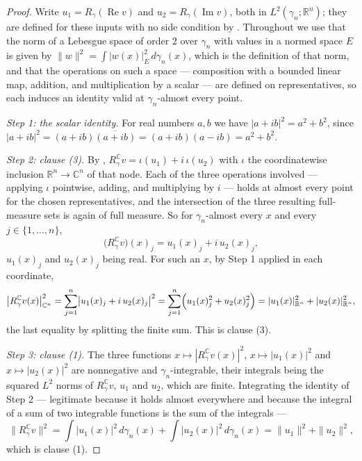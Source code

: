 \begin{proof}
Write $u_1 = R_\gamma(\operatorname{Re} v)$ and $u_2 = R_\gamma(\operatorname{Im} v)$,
both in $L^2(\gamma_n;\mathbb{R}^n)$; they are defined for these inputs with no
side condition by .  Throughout we use that the norm of a
Lebesgue space of order $2$ over $\gamma_n$ with values in a normed space $E$ is
given by $\|w\|^2 = \int |w(x)|_E^2 \, d\gamma_n(x)$, which is the definition of
that norm, and that the operations on such a space --- composition with a bounded
linear map, addition, and multiplication by a scalar --- are defined on
representatives, so each induces an identity valid at $\gamma_n$-almost every
point.

\emph{Step 1: the scalar identity.}
For real numbers $a, b$ we have $|a + ib|^2 = a^2 + b^2$, since
$|a+ib|^2 = (a+ib)\overline{(a+ib)} = (a+ib)(a-ib) = a^2 + b^2$.

\emph{Step 2: clause (3).}
By ,
$R_\gamma^{\mathbb{C}} v = \iota(u_1) + i\,\iota(u_2)$ with $\iota$ the
coordinatewise inclusion $\mathbb{R}^n \to \mathbb{C}^n$ of that node.  Each of
the three operations involved --- applying $\iota$ pointwise, adding, and
multiplying by $i$ --- holds at almost every point for the chosen
representatives, and the intersection of the three resulting full-measure sets
is again of full measure.  So for $\gamma_n$-almost every $x$ and every
$j \in \{1,\ldots,n\}$,
\[
  \bigl(R_\gamma^{\mathbb{C}} v\bigr)(x)_j
    = u_1(x)_j + i\,u_2(x)_j ,
\]
$u_1(x)_j$ and $u_2(x)_j$ being real.  For such an $x$, by Step 1 applied in
each coordinate,
\[
  \bigl|R_\gamma^{\mathbb{C}} v(x)\bigr|_{\mathbb{C}^n}^2
    = \sum_{j=1}^n \bigl|u_1(x)_j + i\,u_2(x)_j\bigr|^2
    = \sum_{j=1}^n \Bigl(u_1(x)_j^2 + u_2(x)_j^2\Bigr)
    = |u_1(x)|_{\mathbb{R}^n}^2 + |u_2(x)|_{\mathbb{R}^n}^2 ,
\]
the last equality by splitting the finite sum.  This is clause (3).

\emph{Step 3: clause (1).}
The three functions $x \mapsto |R_\gamma^{\mathbb{C}} v(x)|^2$,
$x \mapsto |u_1(x)|^2$ and $x \mapsto |u_2(x)|^2$ are nonnegative and
$\gamma_n$-integrable, their integrals being the squared $L^2$ norms of
$R_\gamma^{\mathbb{C}} v$, $u_1$ and $u_2$, which are finite.  Integrating the
identity of Step 2 --- legitimate because it holds almost everywhere and
because the integral of a sum of two integrable functions is the sum of the
integrals ---
\[
  \bigl\|R_\gamma^{\mathbb{C}} v\bigr\|^2
    = \int |u_1(x)|^2 \, d\gamma_n(x) + \int |u_2(x)|^2 \, d\gamma_n(x)
    = \|u_1\|^2 + \|u_2\|^2 ,
\]
which is clause (1).


\end{proof}

